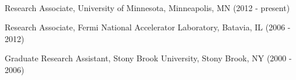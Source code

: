 \documentclass[amsmath,amssymb]{revtex4}
\begin{document}
 \\
\begin{list}{}
            {\setlength{\itemsep}{0.0in}\setlength{\parsep}{0.0in}
             \addtolength{\parskip}{-0.5in}}
\item Research Associate, University of Minnesota, Minneapolis, MN (2012 - present)
\item Research Associate, Fermi National Accelerator Laboratory, Batavia, IL (2006 - 2012)
\item Graduate Research Assistant, Stony Brook University, Stony Brook, NY (2000 - 2006) %
\end{list}
\vspace{\baselineskip}



{} \\
\end{document}
